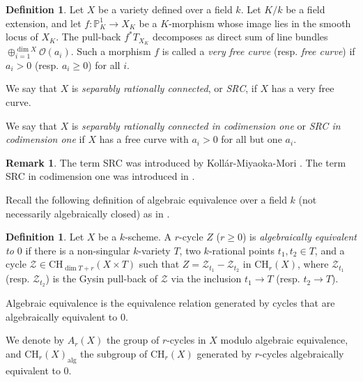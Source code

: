 \documentclass{amsart}
\theoremstyle{definition}
\newtheorem{defn}[theorem]{Definition}
\newtheorem{rem}[theorem]{Remark}
\theoremstyle{remark}
\newcommand{\mbb}{\mathbb}
\newcommand{\PP}{\mbb{P}}
\newcommand{\mc}{\mathcal}
\newcommand{\OO}{\mc{O}}
\begin{document}
\begin{defn}
    Let $X$ be a variety defined over a field $k$. Let $K/k$ be a field extension, and let $f: \PP^1_K \to X_K$  be a $K$-morphism  whose image lies in the smooth locus of $X_K$. The pull-back $f^*T_{X_K}$ decomposes as direct sum of line bundles $\oplus_{i=1}^{\dim X} \OO(a_i)$.
    Such a morphism $f$ is called a \emph{very free curve} (resp. \emph{free curve}) if $a_i>0$ (resp. $a_i\geq 0$) for all $i$.
    
    We say that $X$ is \emph{separably rationally connected}, or \emph{SRC}, if $X$ has a very free curve.
    
    We say that $X$ is \emph{separably rationally connected in codimension one} or \emph{SRC in codimension one} if $X$ has a free curve with $a_i> 0$ for all but one $a_i$.
\end{defn}
\begin{rem}
    The term SRC was introduced by Koll\'ar-Miyaoka-Mori \cite{KMM92RC}. The term SRC in codimension one was introduced in \cite{Kollar_Tian}. 
\end{rem}


Recall the following definition of algebraic equivalence over a field $k$ (not necessarily algebraically closed) as in \cite[Definition 10.3]{Fulton98}.

\begin{defn}\label{def:alg_equiv}
    Let $X$ be a $k$-scheme. A $r$-cycle $Z$ ($r\geq 0$) is \emph{algebraically equivalent to $0$} if there is a non-singular $k$-variety $T$, two $k$-rational points $t_1, t_2 \in T$, and a cycle $\mathcal{Z} \in \text{CH}_{\dim T+r}(X\times T)$ such that $Z=\mathcal{Z}_{t_1}-\mathcal{Z}_{t_2}$ in $\text{CH}_r(X)$, where $\mathcal{Z}_{t_1}$ (resp. $\mathcal{Z}_{t_2}$) is the Gysin pull-back of $\mathcal{Z}$ via the inclusion $t_1 \to T$ (resp. $t_2 \to T$).
    
    Algebraic  equivalence is the equivalence  relation generated by cycles that are algebraically equivalent to $0$.
    
    We denote by $A_r(X)$ the group of $r$-cycles in $X$ modulo algebraic equivalence, and $\text{CH}_r(X)_{\text{alg}}$ the subgroup of $\text{CH}_r(X)$ generated by $r$-cycles algebraically equivalent to $0$.
\end{defn}
\end{document}
